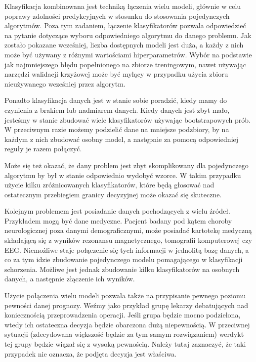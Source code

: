 \documentclass[12pt,a4paper,twoside,openany]{book}
\begin{document}
Klasyfikacja kombinowana jest techniką łączenia wielu modeli, głównie w celu poprawy zdolności predykcyjnych w stosunku do stosowania pojedynczych algorytmów. Poza tym zadaniem, łączenie klasyfikatorów pozwala odpowiedzieć na pytanie dotyczące wyboru odpowiedniego algorytmu do danego problemu. Jak zostało pokazane wcześniej, liczba dostępnych modeli jest duża, a każdy z nich może być używany z różnymi wartościami hiperparametrów. Wybór na podstawie jak najmniejszego błędu popełnionego na zbiorze treningowym, nawet używając narzędzi walidacji krzyżowej może być mylący w przypadku użycia zbioru nieużywanego wcześniej przez algorytm. 

Ponadto klasyfikacja danych jest w stanie sobie poradzić, kiedy mamy do czynienia z brakiem lub nadmiarem danych. Kiedy danych jest zbyt mało, jesteśmy w stanie zbudować wiele klasyfikatorów używając bootstrapowych prób. W przeciwnym razie możemy podzielić dane na mniejsze podzbiory, by na każdym z nich zbudować osobny model, a następnie za pomocą odpowiedniej reguły je razem połączyć. 

Może się też okazać, że dany problem jest zbyt skomplikowany dla pojedynczego algorytmu by był w stanie odpowiednio wydobyć wzorce. W takim przypadku użycie kilku zróżnicowanych klasyfikatorów, które będą głosować nad ostatecznym przebiegiem granicy decyzyjnej może okazać się skuteczne. 

Kolejnym problemem jest posiadanie danych pochodzących z wielu źródeł. Przykładem mogą być dane medyczne. Pacjent badany pod kątem choroby neurologicznej poza danymi demograficznymi, może posiadać kartotekę medyczną składającą się z wyników rezonansu magnetycznego, tomografii komputerowej czy EEG. Niemożliwe staje połączenie się tych informacji w jednolitą bazę danych, a co za tym idzie zbudowanie pojedynczego modelu pomagającego w klasyfikacji schorzenia. Możliwe jest jednak zbudowanie kilku klasyfikatorów na osobnych danych, a następnie złączenie ich wyników.

Użycie połączenia wielu modeli pozwala także na przypisanie pewnego poziomu pewności danej prognozy. Weźmy jako przykład grupę lekarzy debatujących nad koniecznością przeprowadzenia operacji. Jeśli grupa będzie mocno podzielona, wtedy ich ostateczna decyzja będzie obarczona dużą niepewnością. W przeciwnej sytuacji (zdecydowana większość będzie za tym samym rozwiązaniem) werdykt tej grupy będzie wiązał się z wysoką pewnością. Należy tutaj zaznaczyć, że taki przypadek nie oznacza, że podjęta decyzja jest właściwa.
\end{document}
